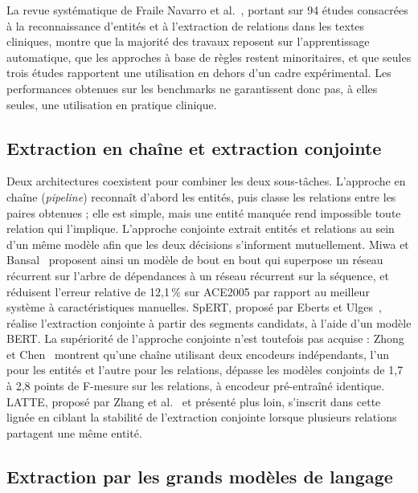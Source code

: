 La revue systématique de Fraile Navarro et al.~\cite{fraile2023review}, portant sur 94 études consacrées à la reconnaissance d'entités et à l'extraction de relations dans les textes cliniques, montre que la majorité des travaux reposent sur l'apprentissage automatique, que les approches à base de règles restent minoritaires, et que seules trois études rapportent une utilisation en dehors d'un cadre expérimental. Les performances obtenues sur les benchmarks ne garantissent donc pas, à elles seules, une utilisation en pratique clinique.

\subsection{Extraction en chaîne et extraction conjointe}

Deux architectures coexistent pour combiner les deux sous-tâches. L'approche en chaîne (\textit{pipeline}) reconnaît d'abord les entités, puis classe les relations entre les paires obtenues ; elle est simple, mais une entité manquée rend impossible toute relation qui l'implique. L'approche conjointe extrait entités et relations au sein d'un même modèle afin que les deux décisions s'informent mutuellement. Miwa et Bansal~\cite{miwa2016endtoend} proposent ainsi un modèle de bout en bout qui superpose un réseau récurrent sur l'arbre de dépendances à un réseau récurrent sur la séquence, et réduisent l'erreur relative de 12,1\,\% sur ACE2005 par rapport au meilleur système à caractéristiques manuelles. SpERT, proposé par Eberts et Ulges~\cite{eberts2020spert}, réalise l'extraction conjointe à partir des segments candidats, à l'aide d'un modèle BERT. La supériorité de l'approche conjointe n'est toutefois pas acquise : Zhong et Chen~\cite{zhong2021frustratingly} montrent qu'une chaîne utilisant deux encodeurs indépendants, l'un pour les entités et l'autre pour les relations, dépasse les modèles conjoints de 1,7 à 2,8 points de F-mesure sur les relations, à encodeur pré-entraîné identique. LATTE, proposé par Zhang et al.~\cite{zhang2026latte} et présenté plus loin, s'inscrit dans cette lignée en ciblant la stabilité de l'extraction conjointe lorsque plusieurs relations partagent une même entité.

\subsection{Extraction par les grands modèles de langage}

